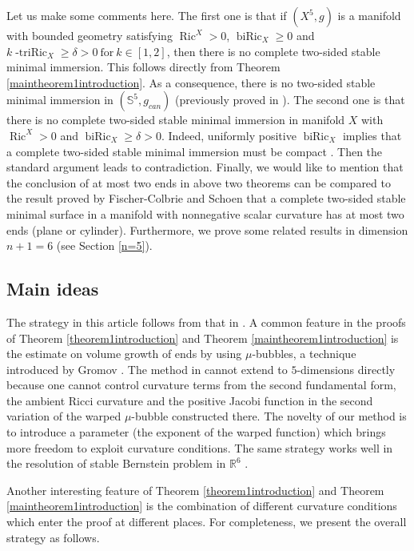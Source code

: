 \documentclass[11pt,letterpaper]{amsart}
\DeclareMathOperator{\Ric}{Ric}
\DeclareMathOperator{\biRic}{biRic}
\theoremstyle{definition}
\theoremstyle{remark}
\numberwithin{equation}{section}
\begin{document}
Let us make some comments here. The first one is that if $(X^5,g)$ is a manifold with bounded geometry satisfying $\Ric^X>0$, $\operatorname{biRic}_X\geq 0$ and $k\operatorname{-triRic}_X\geq \delta>0\ \text{for}\ k\in[1,2]$, then there is no complete two-sided stable minimal immersion. This follows directly from Theorem \ref{maintheorem1introduction}. As a consequence, there is no two-sided stable minimal immersion in $(\mathbb{S}^5,g_{can})$ (previously proved in \cite{catino}). The second one is that there is no complete two-sided stable minimal immersion in manifold $X$ with $\Ric^X>0 $ and $\biRic_X\geq \delta >0$. Indeed, uniformly positive $\biRic_X$ implies that a complete two-sided stable minimal immersion must be compact \cite{shenyingyerugang}. Then the standard argument leads to contradiction.  Finally, we would like to mention that the conclusion of at most two ends in above two theorems can be compared to the result proved by Fischer-Colbrie and Schoen \cite{Fischer-Colbrie-Schoen-The-structure-of-complete-stable} that a complete two-sided stable minimal surface in a manifold with nonnegative scalar curvature has at most two ends (plane or cylinder). Furthermore, we prove some related results in dimension $n+1=6$ (see Section \ref{n=5}).










\subsection{Main ideas}
The strategy in this article follows from that in \cite{chodosh-li-stryker}. A common feature in the proofs of Theorem \ref{theorem1introduction} and Theorem \ref{maintheorem1introduction} is the estimate on volume growth of ends by using $\mu$-bubbles, a technique introduced by Gromov \cite{gromovmububble}. The method in \cite{chodosh-li-stryker} cannot extend to $5$-dimensions directly because one cannot control curvature terms from the second fundamental form, the ambient Ricci curvature and the positive Jacobi function in the second variation of the warped $\mu$-bubble constructed there. The novelty of our method is to introduce a parameter (the exponent of the warped function) which brings more freedom to exploit curvature conditions. The same strategy works well in the resolution of stable Bernstein problem in $\mathbb{R}^6$ \cite{mazet}.

Another interesting feature of Theorem \ref{theorem1introduction} and Theorem \ref{maintheorem1introduction} is the combination of different curvature conditions which enter the proof at different places. For completeness, we present the overall strategy as follows.
\end{document}
